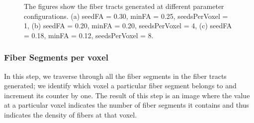 \documentclass{llncs}
\begin{document}
\begin{figure}
    \centering
    \caption{The figures show the fiber tracts generated at different parameter configurations. (a) seedFA = 0.30, minFA = 0.25, seedsPerVoxel = 1, (b) seedFA = 0.20, minFA = 0.20, seedsPerVoxel = 4, (c) seedFA = 0.18, minFA = 0.12, seedsPerVoxel = 8.}
    \label{fig:parameterConfig}
\end{figure}

%
\subsubsection{Fiber Segments per voxel}
%
In this step, we traverse through all the fiber segments in the fiber tracts generated; we identify which voxel a particular fiber segment belongs to and increment its counter by one.  The result of this step is an image where the value at a particular voxel indicates the number of fiber segments it contains and thus indicates the density of fibers at that voxel.
\end{document}
